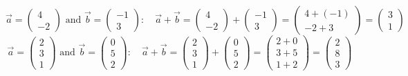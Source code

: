\documentclass[12pt,eng]{skript_ogg}
\begin{document}
\begin{beispiel} 
\[\vec{a}=\begin{pmatrix}4\\-2\end{pmatrix}\text{ and }\vec{b}=\begin{pmatrix}-1\\3\end{pmatrix}:\quad\vec{a}+\vec{b}=\begin{pmatrix}4\\-2\end{pmatrix}+\begin{pmatrix}-1\\3\end{pmatrix}=\begin{pmatrix}4+(-1)\\-2+3\end{pmatrix}=\begin{pmatrix}3\\1\end{pmatrix}\]
\[\vec{a}=\begin{pmatrix}2\\3\\1\end{pmatrix}\text{ and }\vec{b}=\begin{pmatrix}0\\5\\2\end{pmatrix}:\quad\vec{a}+\vec{b}=\begin{pmatrix}2\\3\\1\end{pmatrix}+\begin{pmatrix}0\\5\\2\end{pmatrix}=\begin{pmatrix}2+0\\3+5\\1+2\end{pmatrix}=\begin{pmatrix}2\\8\\3\end{pmatrix}\]
\end{beispiel}
\end{document}

